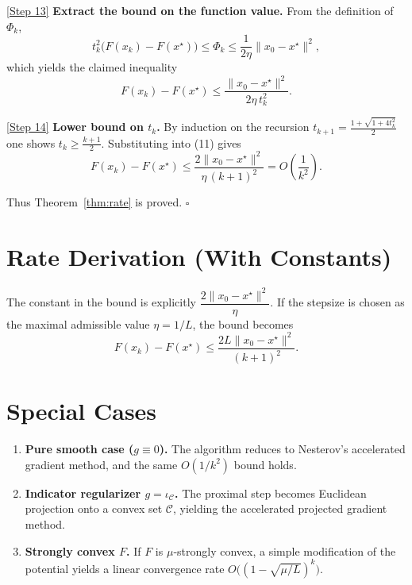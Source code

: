 \documentclass{article}
\begin{document}
\noindent\underline{[Step 13]} \textbf{Extract the bound on the function value.}
From the definition of $\Phi_k$,
\[
t_k^{2}\bigl(F(x_k)-F(x^\star)\bigr)
\le \Phi_k \le \frac{1}{2\eta}\|x_0-x^\star\|^{2},
\]
which yields the claimed inequality
\[
F(x_k)-F(x^\star)\le \frac{\|x_0-x^\star\|^{2}}{2\eta\,t_k^{2}}.
\tag{11}
\]

\noindent\underline{[Step 14]} \textbf{Lower bound on $t_k$.} By induction on the recursion $t_{k+1}= \frac{1+\sqrt{1+4t_k^{2}}}{2}$ one shows $t_k\ge\frac{k+1}{2}$. Substituting into (11) gives
\[
F(x_k)-F(x^\star)\le \frac{2\|x_0-x^\star\|^{2}}{\eta\,(k+1)^{2}} = O\!\left(\frac{1}{k^{2}}\right).
\]

Thus Theorem~\ref{thm:rate} is proved. \hfill $\square$

\section*{Rate Derivation (With Constants)}
The constant in the bound is explicitly $\dfrac{2\|x_0-x^\star\|^{2}}{\eta}$.
If the stepsize is chosen as the maximal admissible value $\eta=1/L$, the bound becomes
\[
F(x_k)-F(x^\star)\le \frac{2L\|x_0-x^\star\|^{2}}{(k+1)^{2}}.
\]

\section*{Special Cases}
\begin{enumerate}
\item \textbf{Pure smooth case ($g\equiv0$).} The algorithm reduces to Nesterov’s accelerated gradient method, and the same $O(1/k^{2})$ bound holds.
\item \textbf{Indicator regularizer $g=\iota_{\mathcal{C}}$.} The proximal step becomes Euclidean projection onto a convex set $\mathcal{C}$, yielding the accelerated projected gradient method.
\item \textbf{Strongly convex $F$.} If $F$ is $\mu$‑strongly convex, a simple modification of the potential yields a linear convergence rate $O\bigl((1-\sqrt{\mu/L})^{k}\bigr)$.
\end{enumerate}
\end{document}
